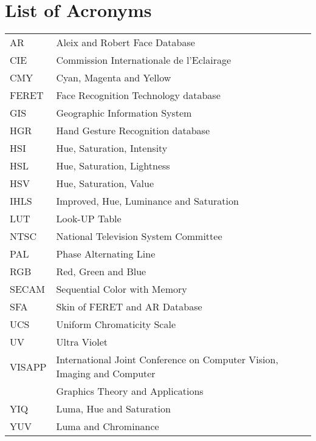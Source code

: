 \documentclass[12pt,twoside,a4paper]{book}
\theoremstyle{plain}
\theoremstyle{definition}
\begin{document}
\chapter{List of Acronyms}
\begin{tabular}{ll}
    AR          & Aleix and Robert Face Database\\
    CIE         & Commission Internationale de l'Eclairage\\
    CMY         & Cyan, Magenta and Yellow\\
    FERET       & Face Recognition Technology database\\
    GIS         & Geographic Information System\\
    HGR         & Hand Gesture Recognition database\\
    HSI         & Hue, Saturation, Intensity\\
    HSL         & Hue, Saturation, Lightness\\
    HSV         & Hue, Saturation, Value\\
    IHLS        & Improved, Hue, Luminance and Saturation\\
    LUT         & Look-UP Table\\
    NTSC        & National Television System Committee\\
    PAL         & Phase Alternating Line\\
    RGB         & Red, Green and Blue\\
    SECAM       & Sequential Color with Memory\\
    SFA         & Skin of FERET and AR Database\\
    UCS         & Uniform Chromaticity Scale\\
    UV          & Ultra Violet\\
    VISAPP      & International Joint Conference on Computer Vision, Imaging and Computer\\
                & Graphics Theory and Applications\\
    YIQ         & Luma, Hue and Saturation\\
    YUV         & Luma and Chrominance\\
\end{tabular}

\end{document}
